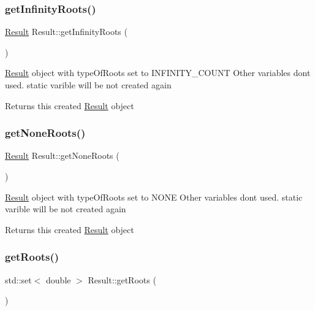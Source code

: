\subsubsection{\texorpdfstring{get\+Infinity\+Roots()}{getInfinityRoots()}}
{\footnotesize\ttfamily \hyperlink{classResult}{Result} Result\+::get\+Infinity\+Roots (\begin{DoxyParamCaption}{ }\end{DoxyParamCaption})\hspace{0.3cm}{\ttfamily [static]}}

\hyperlink{classResult}{Result} object with type\+Of\+Roots set to I\+N\+F\+I\+N\+I\+T\+Y\+\_\+\+C\+O\+U\+NT Other variables don\textquotesingle{}t used. static varible will be not created again \begin{DoxyReturn}{Returns}
this created \hyperlink{classResult}{Result} object 
\end{DoxyReturn}
\mbox{\label{classResult_aa295438130675921abb93d72818f8e19}} 
\subsubsection{\texorpdfstring{get\+None\+Roots()}{getNoneRoots()}}
{\footnotesize\ttfamily \hyperlink{classResult}{Result} Result\+::get\+None\+Roots (\begin{DoxyParamCaption}{ }\end{DoxyParamCaption})\hspace{0.3cm}{\ttfamily [static]}}

\hyperlink{classResult}{Result} object with type\+Of\+Roots set to N\+O\+NE Other variables don\textquotesingle{}t used. static varible will be not created again \begin{DoxyReturn}{Returns}
this created \hyperlink{classResult}{Result} object 
\end{DoxyReturn}
\mbox{\label{classResult_a3d480d756c97fa635e7ad4e6044dd828}} 
\subsubsection{\texorpdfstring{get\+Roots()}{getRoots()}}
{\footnotesize\ttfamily std\+::set$<$ double $>$ Result\+::get\+Roots (\begin{DoxyParamCaption}{ }\end{DoxyParamCaption})}

